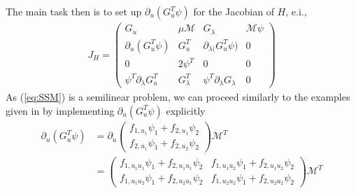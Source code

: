 \documentclass[a4paper,12pt]{article}
\begin{document}
The main task then is to set up $\partial_u (G_u^T \psi)$ for the Jacobian of $H$, e.i.,
\begin{align}
    J_H = \begin{pmatrix}
        G_u & \mu \mathcal{M} & G_\lambda & \mathcal{M}\psi\\
        \partial_u(G_u^T\psi) & G^T_u & \partial_{\lambda(}G_u^T\psi) &0\\
        0 & 2 \psi^T & 0 & 0\\
        \psi^T \partial_\lambda G_u^T & G_\lambda^T & \psi^T \partial_\lambda G_\lambda &0
    \end{pmatrix}
\end{align}
As (\ref{eq:SSM}) is a semilinear problem, we can proceed similarly to the examples given in \cite{p2phome} by implementing $\partial_u (G_u^T \psi)$ explicitly
\begin{align}
    \partial_u (G_u^T \psi) &= \partial_u\begin{pmatrix}
        f_{1,u_1}\psi_1+f_{2,u_1}\psi_2\\
        f_{2,u_1}\psi_1+f_{2,u_2}\psi_2
    \end{pmatrix}\mathcal{M}^T\\
    &=\begin{pmatrix}
        f_{1,u_1u_1}\psi_1 + f_{2,u_1u_1}\psi_2 & f_{1,u_1u_2}\psi_1 + f_{2,u_1u_2}\psi_2\\
        f_{1,u_1u_2}\psi_1 + f_{2,u_2u_1}\psi_2 & f_{1,u_2u_2}\psi_1 + f_{2,u_2u_2}\psi_2
    \end{pmatrix}\mathcal{M}^T
\end{align}

% 
\end{document}
